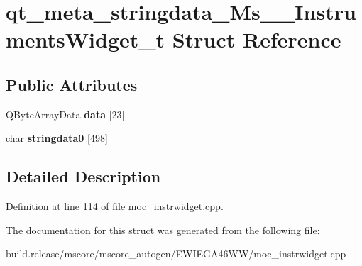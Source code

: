\hypertarget{structqt__meta__stringdata___ms_____instruments_widget__t}{}\section{qt\+\_\+meta\+\_\+stringdata\+\_\+\+Ms\+\_\+\+\_\+\+Instruments\+Widget\+\_\+t Struct Reference}
\label{structqt__meta__stringdata___ms_____instruments_widget__t}
\subsection*{Public Attributes}
\begin{DoxyCompactItemize}
\item 
\mbox{\label{structqt__meta__stringdata___ms_____instruments_widget__t_a8c4c1a99911913f62e24800cf722b48f}} 
Q\+Byte\+Array\+Data {\bfseries data} \mbox{[}23\mbox{]}
\item 
\mbox{\label{structqt__meta__stringdata___ms_____instruments_widget__t_a19537ca233440bf3282e9fc889e79785}} 
char {\bfseries stringdata0} \mbox{[}498\mbox{]}
\end{DoxyCompactItemize}


\subsection{Detailed Description}


Definition at line 114 of file moc\+\_\+instrwidget.\+cpp.



The documentation for this struct was generated from the following file\+:\begin{DoxyCompactItemize}
\item 
build.\+release/mscore/mscore\+\_\+autogen/\+E\+W\+I\+E\+G\+A46\+W\+W/moc\+\_\+instrwidget.\+cpp\end{DoxyCompactItemize}

